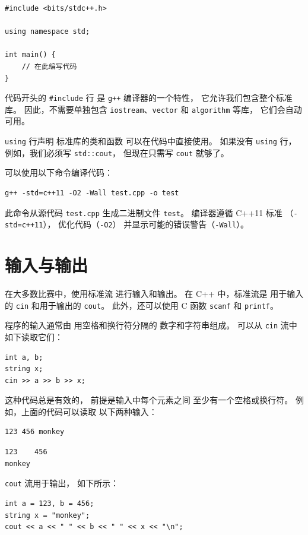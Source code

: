 \begin{lstlisting}
#include <bits/stdc++.h>

using namespace std;

int main() {
    // 在此编写代码
}
\end{lstlisting}

代码开头的 \texttt{\#include} 行
是 \texttt{g++} 编译器的一个特性，
它允许我们包含整个标准库。
因此，不需要单独包含
\texttt{iostream}、\texttt{vector} 和 \texttt{algorithm} 等库，
它们会自动可用。

\texttt{using} 行声明
标准库的类和函数
可以在代码中直接使用。
如果没有 \texttt{using} 行，
例如，我们必须写 \texttt{std::cout}，
但现在只需写 \texttt{cout} 就够了。

可以使用以下命令编译代码：

\begin{lstlisting}
g++ -std=c++11 -O2 -Wall test.cpp -o test
\end{lstlisting}

此命令从源代码 \texttt{test.cpp}
生成二进制文件 \texttt{test}。
编译器遵循 C++11 标准
（\texttt{-std=c++11}），
优化代码（\texttt{-O2}）
并显示可能的错误警告（\texttt{-Wall}）。

\section{输入与输出}


在大多数比赛中，使用标准流
进行输入和输出。
在 C++ 中，标准流是
用于输入的 \texttt{cin} 和用于输出的 \texttt{cout}。
此外，还可以使用 C 函数
\texttt{scanf} 和 \texttt{printf}。

程序的输入通常由
用空格和换行符分隔的
数字和字符串组成。
可以从 \texttt{cin} 流中
如下读取它们：

\begin{lstlisting}
int a, b;
string x;
cin >> a >> b >> x;
\end{lstlisting}

这种代码总是有效的，
前提是输入中每个元素之间
至少有一个空格或换行符。
例如，上面的代码可以读取
以下两种输入：
\begin{lstlisting}
123 456 monkey
\end{lstlisting}
\begin{lstlisting}
123    456
monkey
\end{lstlisting}
\texttt{cout} 流用于输出，
如下所示：
\begin{lstlisting}
int a = 123, b = 456;
string x = "monkey";
cout << a << " " << b << " " << x << "\n";
\end{lstlisting}

